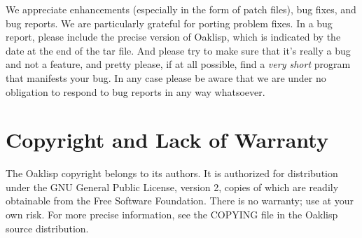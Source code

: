 We appreciate enhancements (especially in the form of patch files),
bug fixes, and bug reports.  We are particularly grateful for porting
problem fixes.  In a bug report, please include the precise version of
Oaklisp, which is indicated by the date at the end of the tar file.
And please try to make sure that it's really a bug and not a feature,
and pretty please, if at all possible, find a \emph{very short} program
that manifests your bug.  In any case please be aware that we are
under no obligation to respond to bug reports in any way whatsoever.

\section{Copyright and Lack of Warranty}

The Oaklisp copyright belongs to its authors.  It is authorized for
distribution under the GNU General Public License, version 2, copies
of which are readily obtainable from the Free Software Foundation.
There is no warranty; use at your own risk.  For more precise
information, see the COPYING file in the Oaklisp source distribution.
